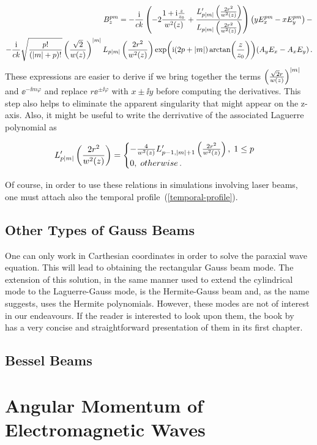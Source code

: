 \documentclass[12pt, class=report, crop=false]{standalone}
\begin{document}
\begin{equation}
  \begin{aligned}
  B_z^{pm} = - \frac{\mathrm{i}}{ck} \left(-2\frac{1+\mathrm{i}\frac{z}{z_0}}{w^2(z)} +\frac{L_{p\abs{m}}'\left(\frac{2r^2}{w^2(z)}\right)}{L_{p\abs{m}}\left(\frac{2r^2}{w^2(z)}\right)}\right) \left( yE_x^{pm} - xE_y^{pm} \right) - \\
  -\frac{\mathrm{i}}{ck}\sqrt{\frac{p!}{(\abs{m}+p)!}} \left(\frac{\sqrt{2}}{w(z)}\right)^{\abs{m}} L_{p\abs{m}} \left(\frac{2r^2}{w^2(z)}\right) \exp(\mathrm{i} (2p+\abs{m}) \arctan(\frac{z}{z_0})) (A_y E_x - A_x E_y)\,.
  \end{aligned}
\end{equation}
These expressions are easier to derive if we bring together the terms \(\left(\frac{\sqrt{2}r}{w(z)}\right)^{\abs{m}}\) and \(\ee^{-\ii m \varphi}\) and replace \(r\ee^{\pm\ii \varphi}\) with \(x\pm\ii y\) before computing the derivatives. This step also helps to eliminate the apparent singularity that might appear on the z-axis. Also, it might be useful to write the derrivative of the associated Laguerre polynomial as

\begin{equation}
  L_{p\abs{m}}'\left(\frac{2r^2}{w^2(z)}\right) =
  \begin{cases}
    - \frac{4}{w^2(z)} L_{p-1,\abs{m}+1}'\left(\frac{2r^2}{w^2(z)}\right),\; 1\leq p\\
    0,\; otherwise\,.
  \end{cases}
\end{equation}

Of course, in order to use these relations in simulations involving laser beams, one must attach also the temporal profile~(\ref{temporal-profile}).

\subsection{Other Types of Gauss Beams}

One can only work in Carthesian coordinates in order to solve the paraxial wave equation. This will lead to obtaining the rectangular Gauss beam mode. The extension of this solution, in the same manner used to extend the cylindrical mode to the Laguerre-Gauss mode, is the Hermite-Gauss beam and, as the name suggests, uses the Hermite polynomials. However, these modes are not of interest in our endeavours. If the reader is interested to look upon them, the book by~\cite{goldsmithQuasiopticalSystemsGaussian1998} has a very concise and straightforward presentation of them in its first chapter.

\subsection{Bessel Beams}
\section{Angular Momentum of Electromagnetic Waves}
\end{document}
